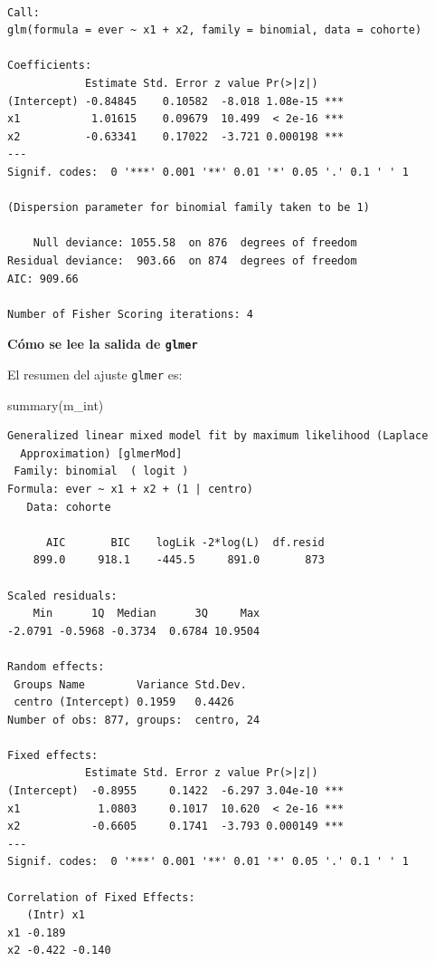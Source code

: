 \documentclass[
  letterpaper,
  DIV=11,
  numbers=noendperiod]{scrartcl}
\newenvironment{Shaded}{\begin{snugshade}}{\end{snugshade}}
\newcommand{\FunctionTok}[1]{\textcolor[rgb]{0.28,0.35,0.67}{#1}}
\newcommand{\NormalTok}[1]{\textcolor[rgb]{0.00,0.23,0.31}{#1}}
\begin{document}
\begin{verbatim}

Call:
glm(formula = ever ~ x1 + x2, family = binomial, data = cohorte)

Coefficients:
            Estimate Std. Error z value Pr(>|z|)    
(Intercept) -0.84845    0.10582  -8.018 1.08e-15 ***
x1           1.01615    0.09679  10.499  < 2e-16 ***
x2          -0.63341    0.17022  -3.721 0.000198 ***
---
Signif. codes:  0 '***' 0.001 '**' 0.01 '*' 0.05 '.' 0.1 ' ' 1

(Dispersion parameter for binomial family taken to be 1)

    Null deviance: 1055.58  on 876  degrees of freedom
Residual deviance:  903.66  on 874  degrees of freedom
AIC: 909.66

Number of Fisher Scoring iterations: 4
\end{verbatim}

\textbf{Cómo se lee la salida de \texttt{glmer}}

El resumen del ajuste \texttt{glmer} es:

\begin{Shaded}
\begin{Highlighting}[]
\FunctionTok{summary}\NormalTok{(m\_int)}
\end{Highlighting}
\end{Shaded}

\begin{verbatim}
Generalized linear mixed model fit by maximum likelihood (Laplace
  Approximation) [glmerMod]
 Family: binomial  ( logit )
Formula: ever ~ x1 + x2 + (1 | centro)
   Data: cohorte

      AIC       BIC    logLik -2*log(L)  df.resid 
    899.0     918.1    -445.5     891.0       873 

Scaled residuals: 
    Min      1Q  Median      3Q     Max 
-2.0791 -0.5968 -0.3734  0.6784 10.9504 

Random effects:
 Groups Name        Variance Std.Dev.
 centro (Intercept) 0.1959   0.4426  
Number of obs: 877, groups:  centro, 24

Fixed effects:
            Estimate Std. Error z value Pr(>|z|)    
(Intercept)  -0.8955     0.1422  -6.297 3.04e-10 ***
x1            1.0803     0.1017  10.620  < 2e-16 ***
x2           -0.6605     0.1741  -3.793 0.000149 ***
---
Signif. codes:  0 '***' 0.001 '**' 0.01 '*' 0.05 '.' 0.1 ' ' 1

Correlation of Fixed Effects:
   (Intr) x1    
x1 -0.189       
x2 -0.422 -0.140
\end{verbatim}
\end{document}
